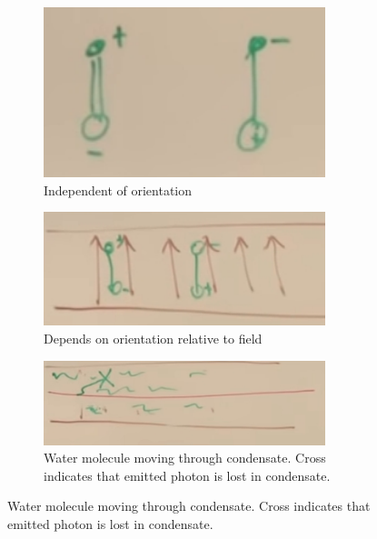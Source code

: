 \documentclass[]{article}
\begin{document}
\begin{figure}[H]
	\caption{Analogy: the water molecule and its mass}\label{fig:2-a2-water-molecule}
	\begin{subfigure}[t]{0.4\textwidth}
		\caption{Independent of orientation}
		\includegraphics[width=0.9\textwidth]{2-a2-water-molecule}
	\end{subfigure}
	\begin{subfigure}[t]{0.4\textwidth}
		\caption{Depends on orientation relative to field}\label{fig:2-a2-water-molecule-in-field}
		\includegraphics[width=0.9\textwidth]{2-a2-water-molecule-in-field}
	\end{subfigure}
	\begin{subfigure}[t]{\textwidth}
		\caption{Water molecule moving through condensate. Cross indicates that emitted photon is lost in condensate.}\label{fig:2-a2-water-molecule-in-condensate}
		\includegraphics[width=0.9\textwidth]{2-a2-water-molecule-in-condensate}
	\end{subfigure}
\end{figure}
\end{document}
